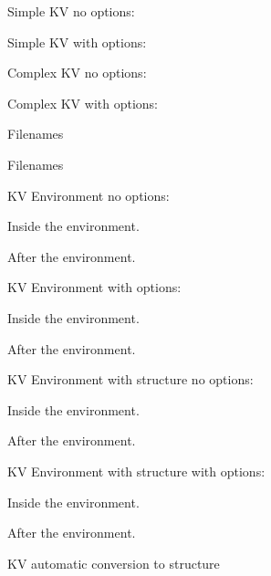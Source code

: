 \documentclass{article}
\begin{document}
Simple KV no options: \KVsimple

Simple KV with options: \KVsimple[width=100, height=200]

Complex KV no options: \KVcomplex

Complex KV with options: \KVcomplex[width=100, height=200]

Filenames \KVsimple[path=a_dir/~foo.bar]

Filenames \textbf{\KVsimple[path=a_dir/~foo.bar]}

KV Environment no options:
\begin{KVenv}
Inside the environment.
\end{KVenv}
After the environment.

KV Environment with options:
\begin{KVenv}[width=100, height=200]
Inside the environment.
\end{KVenv}
After the environment.


KV Environment with structure no options:
\begin{KVstruct}
Inside the environment.
\end{KVstruct}
After the environment.

KV Environment with structure with options:
\begin{KVstruct}[width=100, height=200]
Inside the environment.
\end{KVstruct}
After the environment.

KV automatic conversion to structure
\end{document}
